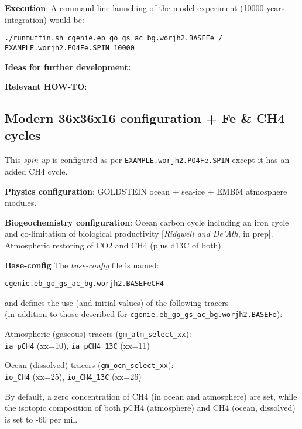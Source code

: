 \documentclass[10pt,twoside]{article}
\begin{document}
\noindent \textbf{Execution}: A command-line launching of the model experiment (10000 years integration) would be:
\vspace{-10pt}\begin{verbatim}./runmuffin.sh cgenie.eb_go_gs_ac_bg.worjh2.BASEFe /
EXAMPLE.worjh2.PO4Fe.SPIN 10000\end{verbatim}\vspace{-5pt}

\noindent \textbf{Ideas for further development:} 

\noindent \textbf{Relevant HOW-TO}: 


\subsection{Modern 36x36x16 configuration + Fe \& CH4 cycles}\label{EXAMPLE.worjh2.PO4FeCH4.SPIN}

This \textit{spin-up} is configured as per \texttt{EXAMPLE.worjh2.PO4Fe.SPIN} except it has an added CH4 cycle.

\noindent \textbf{Physics configuration}: GOLDSTEIN ocean + sea-ice + EMBM atmosphere modules.

\noindent \textbf{Biogeochemistry configuration}: Ocean carbon cycle including an iron cycle and co-limitation of biological productivity [\textit{Ridgwell and De'Ath}, in prep]. Atmospheric restoring of CO2 and CH4 (plus d13C of both).

\noindent \textbf{Base-config} The \textit{base-config} file is named:
\vspace{-10pt}\begin{verbatim}cgenie.eb_go_gs_ac_bg.worjh2.BASEFeCH4\end{verbatim}\vspace{-10pt}
and defines the use (and initial values) of the following tracers
\\ (in addition to those described for \texttt{cgenie.eb\_go\_gs\_ac\_bg.worjh2.BASEFe}):
\begin{compactenum}
        
        \item Atmospheric (gaseous) tracers (\texttt{gm\_atm\_select\_xx}):
        \\\texttt{ia\_pCH4} (xx=10), \texttt{ia\_pCH4\_13C} (xx=11)
        \item Ocean (dissolved) tracers (\texttt{gm\_ocn\_select\_xx}):
        \\\texttt{io\_CH4} (xx=25), \texttt{io\_CH4\_13C} (xx=26)
                
\end{compactenum}
By default, a zero concentration of CH4 (in ocean and atmosphere) are set, while the isotopic composition of both pCH4 (atmosphere) and CH4 (ocean, dissolved) is set to -60 per mil.
\end{document}
